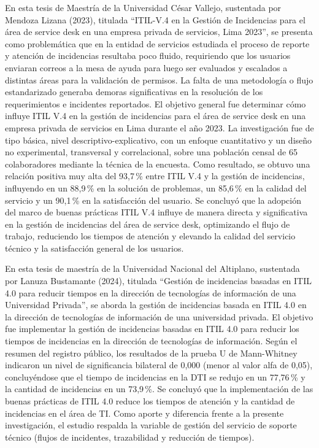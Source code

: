En esta tesis de Maestría de la Universidad César Vallejo, sustentada por Mendoza Lizana (2023), titulada ``ITIL-V.4 en la Gestión de Incidencias para el área de service desk en una empresa privada de servicios, Lima 2023'', se presenta como problemática que en la entidad de servicios estudiada el proceso de reporte y atención de incidencias resultaba poco fluido, requiriendo que los usuarios enviaran correos a la mesa de ayuda para luego ser evaluados y escalados a distintas áreas para la validación de permisos. La falta de una metodología o flujo estandarizado generaba demoras significativas en la resolución de los requerimientos e incidentes reportados. El objetivo general fue determinar cómo influye ITIL V.4 en la gestión de incidencias para el área de service desk en una empresa privada de servicios en Lima durante el año 2023. La investigación fue de tipo básica, nivel descriptivo-explicativo, con un enfoque cuantitativo y un diseño no experimental, transversal y correlacional, sobre una población censal de 65 colaboradores mediante la técnica de la encuesta. Como resultado, se obtuvo una relación positiva muy alta del 93,7\,\% entre ITIL V.4 y la gestión de incidencias, influyendo en un 88,9\,\% en la solución de problemas, un 85,6\,\% en la calidad del servicio y un 90,1\,\% en la satisfacción del usuario. Se concluyó que la adopción del marco de buenas prácticas ITIL V.4 influye de manera directa y significativa en la gestión de incidencias del área de service desk, optimizando el flujo de trabajo, reduciendo los tiempos de atención y elevando la calidad del servicio técnico y la satisfacción general de los usuarios.

\vspace{0.8em}

En esta tesis de maestría de la Universidad Nacional del Altiplano, sustentada por Lanuza Bustamante (2024), titulada ``Gestión de incidencias basadas en ITIL 4.0 para reducir tiempos en la dirección de tecnologías de información de una Universidad Privada'', se aborda la gestión de incidencias basada en ITIL 4.0 en la dirección de tecnologías de información de una universidad privada. El objetivo fue implementar la gestión de incidencias basadas en ITIL 4.0 para reducir los tiempos de incidencias en la dirección de tecnologías de información. Según el resumen del registro público, los resultados de la prueba U de Mann-Whitney indicaron un nivel de significancia bilateral de 0,000 (menor al valor alfa de 0,05), concluyéndose que el tiempo de incidencias en la DTI se redujo en un 77,76\,\% y la cantidad de incidencias en un 73,9\,\%. Se concluyó que la implementación de las buenas prácticas de ITIL 4.0 reduce los tiempos de atención y la cantidad de incidencias en el área de TI. Como aporte y diferencia frente a la presente investigación, el estudio respalda la variable de gestión del servicio de soporte técnico (flujos de incidentes, trazabilidad y reducción de tiempos).

